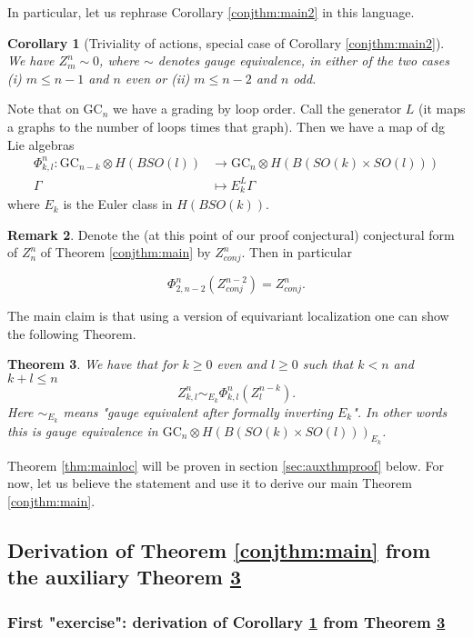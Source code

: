 \documentclass[a4paper]{amsart}
\theoremstyle{plain}
\newtheorem{thm}{Theorem}
\newtheorem{cor}[thm]{Corollary}
\theoremstyle{definition}
\newtheorem{rem}[thm]{Remark}
\newcommand{\GC}{\mathrm{GC}}
\newcommand{\SO}{\mathit{SO}}
\newcommand{\beq}[1]{
\begin{equation}\label{#1}
}
\newcommand{\eeq}{
\end{equation}
}
\begin{document}
In particular, let us rephrase Corollary \ref{conjthm:main2} in this language.
\begin{cor}[Triviality of actions, special case of Corollary \ref{conjthm:main2}]
\label{cor:trivial}
We have $Z_m^n\sim 0$, where $\sim$ denotes gauge equivalence, in either of the two cases (i) $m\leq n-1$ and $n$ even or (ii) $m\leq n-2$ and $n$ odd. 
\end{cor}


Note that on $\GC_n$ we have a grading by loop order. Call the generator $L$ (it maps a graphs to the number of loops times that graph).
Then we have a map of dg Lie algebras
\begin{align*}
\Phi_{k,l}^n:  \GC_{n-k}\otimes H(B \SO(l)) &\to  \GC_n\otimes H(B(\SO(k)\times \SO(l)))
\\
\Gamma &\mapsto E_k^L \Gamma
\end{align*}
where $E_k$ is the Euler class in $H(B\SO(k))$.

\begin{rem}
Denote the (at this point of our proof conjectural) conjectural form of $Z_n^n$ of Theorem \ref{conjthm:main} by $Z^n_{conj}$. Then in particular
\beq{equ:PhiZ}
\Phi_{2,n-2}^n(Z_{conj}^{n-2}) = Z_{conj}^n.
\eeq
\end{rem}

The main claim is that using a version of equivariant localization one can show the following Theorem.
\begin{thm}\label{thm:locmain}\label{thm:mainloc}
We have that for $k\geq 0$ even and $l\geq 0$ such that $k<n$ and $k+l\leq n$
\[
Z_{k,l}^n \sim_{E_k} \Phi_{k,l}^n (Z_{l}^{n-k}).
\]
Here $\sim_{E_k}$ means "gauge equivalent after formally inverting $E_k$". In other words this is gauge equivalence in 
$\GC_n\otimes H(B(\SO(k)\times \SO(l)))_{E_k}$.
\end{thm}

Theorem \ref{thm:mainloc} will be proven in section \ref{sec:auxthmproof} below. For now, let us believe the statement and use it to derive our main Theorem \ref{conjthm:main}.

\subsection{Derivation of Theorem \ref{conjthm:main} from the auxiliary Theorem \ref{thm:locmain} }

\subsubsection{First "exercise": derivation of Corollary \ref{cor:trivial} from Theorem \ref{thm:locmain}}
\end{document}

